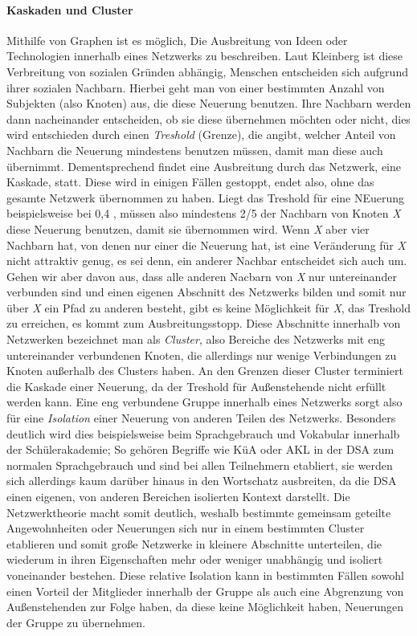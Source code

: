 {\paragraph{Kaskaden und Cluster}

Mithilfe von Graphen ist es möglich, Die Ausbreitung von Ideen oder Technologien innerhalb eines Netzwerks zu beschreiben.
Laut Kleinberg ist diese Verbreitung von sozialen Gründen abhängig, Menschen entscheiden sich aufgrund ihrer sozialen Nachbarn.
Hierbei geht man von einer bestimmten Anzahl von Subjekten (also Knoten) aus, die diese Neuerung benutzen.
Ihre Nachbarn werden dann nacheinander entscheiden, ob sie diese übernehmen möchten oder nicht, dies wird entschieden durch einen \emph{Treshold} (Grenze), die angibt, welcher Anteil von Nachbarn die Neuerung mindestens benutzen müssen, damit man diese auch übernimmt.
Dementsprechend findet eine Ausbreitung durch das Netzwerk, eine Kaskade, statt.
Diese wird in einigen Fällen gestoppt, endet also, ohne das gesamte Netzwerk übernommen zu haben.
Liegt das Treshold für eine NEuerung beispielsweise bei 0,4 , müssen also mindestens 2/5 der Nachbarn von Knoten \emph{X} diese Neuerung benutzen, damit sie übernommen wird.
Wenn \emph{X} aber vier Nachbarn hat, von denen nur einer die Neuerung hat, ist eine Veränderung für \emph{X} nicht attraktiv genug, es sei denn, ein anderer Nachbar entscheidet sich auch um.
Gehen wir aber davon aus, dass alle anderen Nacbarn von \emph{X} nur untereinander verbunden sind und einen eigenen Abschnitt des Netzwerks bilden und somit nur über \emph{X} ein Pfad zu anderen besteht, gibt es keine Möglichkeit für \emph{X}, das Treshold zu erreichen, es kommt zum Ausbreitungsstopp.
Diese Abschnitte innerhalb von Netzwerken bezeichnet man als \emph{Cluster}, also Bereiche des Netzwerks mit eng untereinander verbundenen Knoten, die allerdings nur wenige Verbindungen zu Knoten außerhalb des Clusters haben.
An den Grenzen dieser Cluster terminiert die Kaskade einer Neuerung, da der Treshold für Außenstehende nicht erfüllt werden kann.
Eine eng verbundene Gruppe innerhalb eines Netzwerks sorgt also für eine \emph{Isolation} einer Neuerung von anderen Teilen des Netzwerks.
Besonders deutlich wird dies beispielsweise beim Sprachgebrauch und Vokabular innerhalb der Schülerakademie;
So gehören Begriffe wie KüA oder AKL in der DSA zum normalen Sprachgebrauch und sind bei allen Teilnehmern etabliert, sie werden sich allerdings kaum darüber hinaus in den Wortschatz ausbreiten, da die DSA einen eigenen, von anderen Bereichen isolierten Kontext darstellt.
Die Netzwerktheorie macht somit deutlich, weshalb bestimmte gemeinsam geteilte Angewohnheiten oder Neuerungen sich nur in einem bestimmten Cluster etablieren und somit große Netzwerke in kleinere Abschnitte unterteilen, die wiederum in ihren Eigenschaften mehr oder weniger unabhängig und isoliert voneinander bestehen.
Diese relative Isolation kann in bestimmten Fällen sowohl einen Vorteil der Mitglieder innerhalb der Gruppe als auch eine Abgrenzung von Außenstehenden zur Folge haben, da diese keine Möglichkeit haben, Neuerungen der Gruppe zu übernehmen.

}
